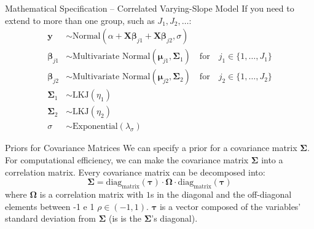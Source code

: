 \begin{frame}{Mathematical Specification -- Correlated Varying-Slope Model}
	If you need to extend to more than one group,
	such as $J_1, J_2, \dots$:
	$$
		\begin{aligned}
			\mathbf{y}              & \sim \text{Normal}(\alpha + \mathbf{X} \boldsymbol{\beta}_{j1} + \mathbf{X} \boldsymbol{\beta}_{j2}, \sigma) \\
			\boldsymbol{\beta}_{j1} & \sim \text{Multivariate Normal}(\boldsymbol{\mu}_{j1}, \boldsymbol{\Sigma}_1)
			\quad \text{for}\quad j_1 \in \{ 1, \dots, J_1 \}                                                                                      \\
			\boldsymbol{\beta}_{j2} & \sim \text{Multivariate Normal}(\boldsymbol{\mu}_{j2}, \boldsymbol{\Sigma}_2)
			\quad \text{for}\quad j_2 \in \{ 1, \dots, J_2 \}                                                                                      \\
			\boldsymbol{\Sigma}_1   & \sim \text{LKJ}(\eta_1)                                                                                      \\
			\boldsymbol{\Sigma}_2   & \sim \text{LKJ}(\eta_2)                                                                                      \\
			\sigma                  & \sim \text{Exponential}(\lambda_\sigma)
		\end{aligned}
	$$
\end{frame}

\begin{frame}{Priors for Covariance Matrices}
	We can specify a prior for a covariance matrix
	$\boldsymbol{\Sigma}$.
	\vfill
	For computational efficiency,
	we can make the covariance matrix $\boldsymbol{\Sigma}$ into a correlation matrix.
	Every covariance matrix can be decomposed into:
	$$
		\boldsymbol{\Sigma}=\text{diag}_\text{matrix}(\boldsymbol{\tau}) \cdot \boldsymbol{\Omega} \cdot \text{diag}_\text{matrix}(\boldsymbol{\tau})
	$$
	where $\boldsymbol{\Omega}$ is a correlation matrix with
	$1$s in the diagonal and the off-diagonal elements between -1 e 1 $\rho \in (-1, 1)$.
	$\boldsymbol{\tau}$ is a vector composed of the variables' standard deviation from
	$\boldsymbol{\Sigma}$ (is is the $\boldsymbol{\Sigma}$'s diagonal).
\end{frame}

